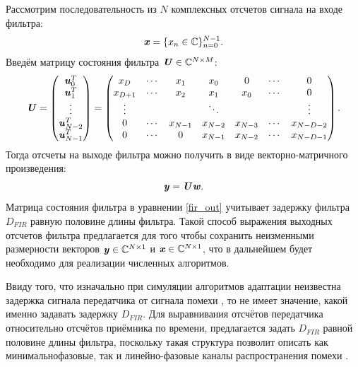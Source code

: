 Рассмотрим последовательность из $N$ комплексных отсчетов сигнала на входе фильтра:
\begin{equation}
	\textbf{\textit{x}}=\{x_n \in \mathbb{C}\}_{n=0}^{N-1}.
	\label{input_sig}
\end{equation}
Введём матрицу состояния \cite{adapt_filt_haykin} фильтра $\textbf{\textit{U}}\in\mathbb{C}^{N\times M}$:
\begin{equation}
	\textbf{\textit{U}}=
	\begin{pmatrix}
		\textbf{\textit{u}}_{0}^{T}\\
		\textbf{\textit{u}}_{1}^{T}\\
		\vdots\\
		\textbf{\textit{u}}_{N-2}^{T}\\
		\textbf{\textit{u}}_{N-1}^{T}
	\end{pmatrix}=
	\begin{pmatrix}
		x_{D} & \cdots & x_1 & x_0 & 0 & \cdots & 0 \\
		x_{D+1} & \cdots & x_2 & x_1 & x_0 & \cdots & 0 \\
		\vdots & & & \ddots & & & \vdots \\
		0 & \cdots & x_{N-1} & x_{N-2} & x_{N-3} & \cdots & x_{N-D-2} \\
		0 & \cdots & 0 & x_{N-1} & x_{N-2} & \cdots & x_{N-D-1} \\
	\end{pmatrix}.
	\label{fir_state_matr}
\end{equation}
Тогда отсчеты на выходе фильтра можно получить в виде векторно-матричного произведения:
\begin{equation}
	\textbf{\textit{y}}=\textbf{\textit{U}}\textbf{\textit{w}}.
	\label{fir_out}
\end{equation}
Матрица состояния фильтра в уравнении \eqref{fir_out} учитывает задержку фильтра $D_{FIR}$ равную половине длины фильтра. Такой способ выражения выходных отсчетов фильтра предлагается для того чтобы сохранить неизменными размерности векторов $\textbf{\textit{y}}\in\mathbb{C}^{N\times 1}$ и $\textbf{\textit{x}}\in\mathbb{C}^{N\times 1}$, что в дальнейшем будет необходимо для реализации численных алгоритмов.

Ввиду того, что изначально при симуляции алгоритмов адаптации неизвестна задержка сигнала  передатчика от сигнала помехи , то не имеет значение, какой именно задавать задержку $D_{FIR}$. Для выравнивания отсчётов передатчика относительно отсчётов приёмника по времени, предлагается задать $D_{FIR}$ равной половине длины фильтра, поскольку такая структура позволит описать как минимальнофазовые, так и линейно-фазовые каналы распространения помехи \cite{dsp_oppenheim}.

